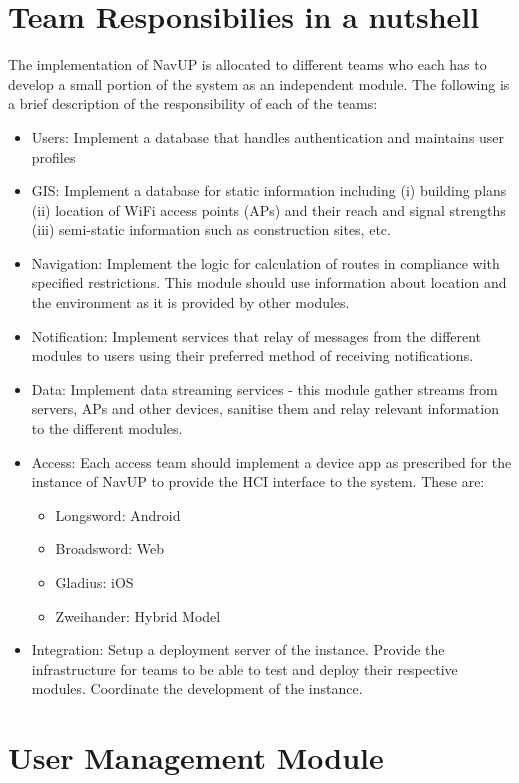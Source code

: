 \documentclass[12pt]{article}
\begin{document}
\section{Team Responsibilies in a nutshell}
The implementation of NavUP is allocated to different teams who each has to develop a small portion of the system as an independent module. The following is a brief description of the responsibility of each of the teams:
\begin{itemize}
\item Users: Implement a database that handles authentication and maintains user profiles
\item GIS: Implement a database for static information including (i) building plans (ii) location of WiFi access points (APs) and their reach and signal strengths (iii) semi-static information such as construction sites, etc.
\item Navigation: Implement the logic for calculation of routes in compliance with specified restrictions. This module should use information about location and the environment as it is provided by other modules.
\item Notification: Implement services that relay of messages from the different modules to users using their preferred method of receiving notifications.
\item Data: Implement data streaming services - this module gather streams from servers, APs and other devices, sanitise them and relay relevant information to the different modules.
\item Access: Each access team should implement a device app as prescribed for the instance of NavUP to provide the HCI interface to the system. These are:
\begin{itemize}
\item Longsword: Android
\item Broadsword: Web
\item Gladius: iOS
\item Zweihander: Hybrid Model

\end{itemize}
\item Integration: Setup a deployment server of the instance. Provide the infrastructure for teams to be able to test and deploy their respective modules. Coordinate the development of the instance.

\end{itemize}
\section{User Management Module}
\end{document}
